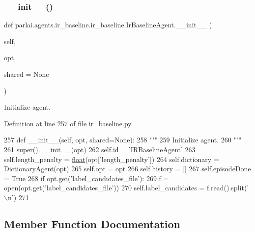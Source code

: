 \subsubsection{\texorpdfstring{\+\_\+\+\_\+init\+\_\+\+\_\+()}{\_\_init\_\_()}}
{\footnotesize\ttfamily def parlai.\+agents.\+ir\+\_\+baseline.\+ir\+\_\+baseline.\+Ir\+Baseline\+Agent.\+\_\+\+\_\+init\+\_\+\+\_\+ (\begin{DoxyParamCaption}\item[{}]{self,  }\item[{}]{opt,  }\item[{}]{shared = {\ttfamily None} }\end{DoxyParamCaption})}

\begin{DoxyVerb}Initialize agent.
\end{DoxyVerb}
 

Definition at line 257 of file ir\+\_\+baseline.\+py.


\begin{DoxyCode}
257     \textcolor{keyword}{def }\_\_init\_\_(self, opt, shared=None):
258         \textcolor{stringliteral}{"""}
259 \textcolor{stringliteral}{        Initialize agent.}
260 \textcolor{stringliteral}{        """}
261         super().\_\_init\_\_(opt)
262         self.id = \textcolor{stringliteral}{'IRBaselineAgent'}
263         self.length\_penalty = \hyperlink{namespaceprojects_1_1controllable__dialogue_1_1make__control__dataset_aa2b7207688c641dbc094ab44eca27113}{float}(opt[\textcolor{stringliteral}{'length\_penalty'}])
264         self.dictionary = DictionaryAgent(opt)
265         self.opt = opt
266         self.history = []
267         self.episodeDone = \textcolor{keyword}{True}
268         \textcolor{keywordflow}{if} opt.get(\textcolor{stringliteral}{'label\_candidates\_file'}):
269             f = open(opt.get(\textcolor{stringliteral}{'label\_candidates\_file'}))
270             self.label\_candidates = f.read().split(\textcolor{stringliteral}{'\(\backslash\)n'})
271 
\end{DoxyCode}


\subsection{Member Function Documentation}
\mbox{\label{classparlai_1_1agents_1_1ir__baseline_1_1ir__baseline_1_1IrBaselineAgent_af4e39c5613a045434a38d260e6fc03e6}} 
